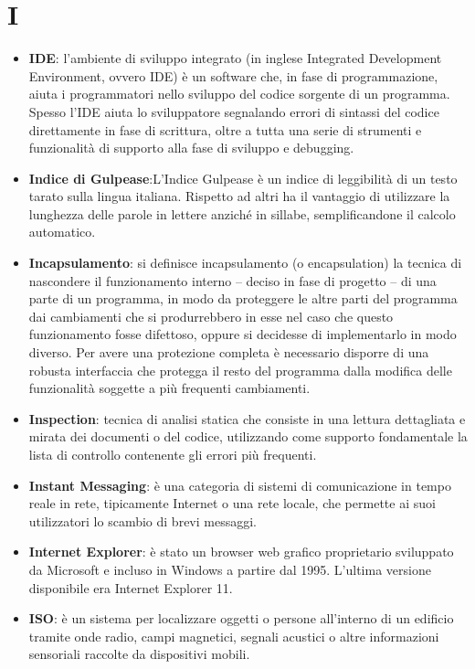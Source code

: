 \section{I}
\begin{itemize} 
	\item
	\textbf{IDE}: l’ambiente di sviluppo integrato (in inglese Integrated Development Environment, ovvero IDE) è un software che, in fase di programmazione, aiuta i programmatori nello sviluppo del codice sorgente di un programma. Spesso l’IDE aiuta lo sviluppatore segnalando errori di sintassi del codice direttamente in fase di scrittura, oltre a tutta una serie di strumenti e funzionalità di supporto alla fase di sviluppo e debugging.
	\item
	\textbf{Indice di Gulpease}:L'Indice Gulpease è un indice di leggibilità di un testo tarato sulla lingua italiana. Rispetto ad altri ha il vantaggio di utilizzare la lunghezza delle parole in lettere anziché in sillabe, semplificandone il calcolo automatico.
	\item
	\textbf{Incapsulamento}: si definisce incapsulamento (o encapsulation) la tecnica di nascondere il funzionamento interno – deciso in fase di progetto – di una parte di un programma, in modo da proteggere le altre parti del programma dai cambiamenti che si produrrebbero in esse nel caso che questo funzionamento fosse difettoso, oppure si decidesse di implementarlo in modo diverso. Per avere una protezione completa è necessario disporre di una robusta interfaccia che protegga il resto del programma dalla modifica delle funzionalità soggette a più frequenti cambiamenti.
	\item
	\textbf{Inspection}: tecnica di analisi statica che consiste in una lettura dettagliata e mirata dei documenti o del codice, utilizzando come supporto fondamentale la lista di controllo contenente gli errori più frequenti.
	\item
	\textbf{Instant Messaging}: è una categoria di sistemi di comunicazione in tempo reale in rete, tipicamente Internet o una rete locale, che permette ai suoi utilizzatori lo scambio di brevi messaggi.
	\item
	\textbf{Internet Explorer}: è stato un browser web grafico proprietario sviluppato da Microsoft e incluso in Windows a partire dal 1995. L'ultima versione disponibile era Internet Explorer 11.
	\item
	\textbf{ISO}: è un sistema per localizzare oggetti o persone all'interno di un edificio tramite onde radio, campi magnetici, segnali acustici o altre informazioni sensoriali raccolte da dispositivi mobili.

\end{itemize}
